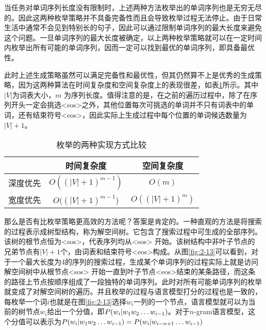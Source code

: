 \parinterval 当任务对单词序列长度没有限制时，上述两种方法枚举出的单词序列也是无穷无尽的。因此这两种枚举策略并不具备完备性而且会导致枚举过程无法停止。由于日常生活中通常不会见到特别长的句子，因此可以通过限制单词序列的最大长度来避免这个问题。一旦单词序列的最大长度被确定，以上两种枚举策略就可以在一定时间内枚举出所有可能的单词序列，因而一定可以找到最优的单词序列，即具备最优性。

\parinterval 此时上述生成策略虽然可以满足完备性和最优性，但其仍然算不上是优秀的生成策略，因为这两种算法在时间复杂度和空间复杂度上的表现很差，如表\ref{tab:2-4}所示。其中$|V|$为词表大小，$m$ 为序列长度。值得注意的是，在之前的遍历过程中，除了在序列开头一定会挑选<sos>之外，其他位置每次可挑选的单词并不只有词表中的单词，还有结束符号<eos>，因此实际上生成过程中每个位置的单词候选数量为$|V|+1$。

\vspace{0.5em}
\begin{table}[htp]{
\begin{center}
\caption{枚举的两种实现方式比较}
{
\begin{tabular}{c|c|c}
\rule{0pt}{10pt} & 时间复杂度 & 空间复杂度\\ \hline
\rule{0pt}{10pt} 深度优先 & $O({(|V|+1)}^{m-1})$ & $O(m)$ \\
\rule{0pt}{10pt} 宽度优先 & $O({(|V|+1)}^{m-1}$) & $O({(|V|+1)}^{m})$ \\
\end{tabular}
\label{tab:2-4}
}
\end{center}
}\end{table}

\parinterval 那么是否有比枚举策略更高效的方法呢？答案是肯定的。一种直观的方法是将搜索的过程表示成树型结构，称为解空间树。它包含了搜索过程中可生成的全部序列。该树的根节点恒为<sos>，代表序列均从<sos> 开始。该树结构中非叶子节点的兄弟节点有$|V|+1$个，由词表和结束符号<eos>构成。从图\ref{fig:2-13}可以看到，对于一个最大长度为4的序列的搜索过程，生成某个单词序列的过程实际上就是访问解空间树中从根节点<sos> 开始一直到叶子节点<eos>结束的某条路径，而这条的路径上节点按顺序组成了一段独特的单词序列。此时对所有可能单词序列的枚举就变成了对解空间树的遍历。并且枚举的过程与语言模型打分的过程也是一致的，每枚举一个词$i$也就是在图\ref{fig:2-13}选择$w_i$一列的一个节点，语言模型就可以为当前的树节点$w_i$给出一个分值，即${P}(w_i | w_1 w_2 \ldots w_{i-1})$。对于$n$-gram语言模型，这个分值可以表示为${P}(w_i | w_1 w_2 \ldots w_{i-1})={P}(w_i | w_{i-n+1} \ldots w_{i-1})$


